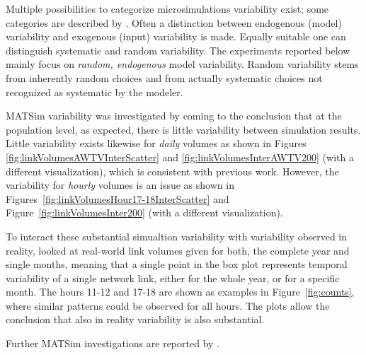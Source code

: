 Multiple possibilities to categorize microsimulations variability exist; some categories are described by \citet[][]{HorniEtAl_TechRep_IVT_2011_b}. Often a distinction between endogenous (model) variability and exogenous (input) variability is made. Equally suitable one can distinguish systematic and random variability. The experiments reported below mainly focus on \emph{random, endogenous} model variability. Random variability stems from inherently random choices and from actually systematic choices not recognized as systematic by the modeler.

MATSim variability was investigated by \citet[][]{HorniEtAl_TechRep_IVT_2011_b, HorniEtAl_STRC_2011, Dayte_TechRep_IVT_2012} coming to the conclusion that at the population level, as expected, there is little variability between simulation results. Little variability exists likewise for \emph{daily} volumes as shown in Figures \ref{fig:linkVolumesAWTVInterScatter} and \ref{fig:linkVolumesInterAWTV200} (with a different visualization), which is consistent with previous work. However, the variability for \emph{hourly} volumes is an issue as shown in Figures~\ref{fig:linkVolumesHour17-18InterScatter} and Figure~\ref{fig:linkVolumesInter200} (with a different visualization).

To interact these substantial simualtion variability with variability observed in reality, \citet[][]{HorniEtAl_STRC_2011} looked at real-world link volumes given for both, the complete year and single months, meaning that a single point in the box plot represents temporal variability of a single network link, either for the whole year, or for a specific month. The hours 11-12 and 17-18 are shown as examples in Figure~\ref{fig:counts}, where similar patterns could be observed for all hours. The plots allow the conclusion that also in reality variability is also substantial.

Further MATSim investigations are reported by \citet[][]{Hackney_PhDThesis_2009, Neumann_PhDThesis_2014}.

